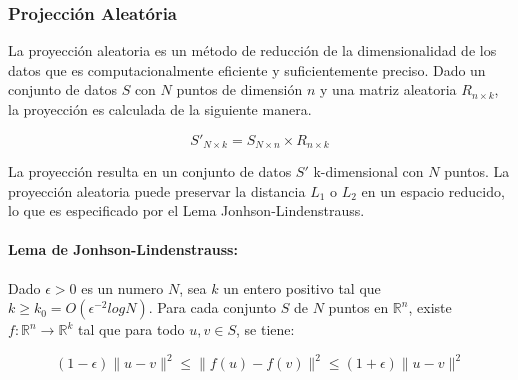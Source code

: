 \subsubsection{Projección Aleatória}

La proyección aleatoria es un método de reducción de la dimensionalidad de los datos que es computacionalmente eficiente y suficientemente preciso. Dado un conjunto de datos $S$ con $N$ puntos de dimensión $n$ y una matriz aleatoria  $ R_{n \times k} $, la proyección es calculada de la siguiente manera.

\begin{equation}
S'_{N \times k} = S_{N \times n} \times R _{n \times k}
\end{equation}

La proyección resulta en un conjunto de datos  $S'$ k-dimensional con $N$ puntos. La proyección aleatoria puede preservar la distancia $L_1$ o $L_2$ en un espacio reducido, lo que es especificado por el Lema Jonhson-Lindenstrauss.


\paragraph*{Lema de Jonhson-Lindenstrauss:} Dado $\epsilon > 0$ es un numero  $N$, sea $k$ un  entero positivo tal que $k \geq k_0 = O (\epsilon^{-2}log N)$. Para cada conjunto $S$ de $N$ puntos en  $\mathbb{R}^n$, existe $f: \mathbb{R}^n \rightarrow  \mathbb{R}^k$   tal que para todo $u,v \in S$, se tiene:

\begin{equation}\label{eq:JL-lemma}
  (1 - \epsilon) \parallel u - v \parallel^2 \leq \parallel f(u) - f(v) \parallel^2 \leq (1 + \epsilon)\parallel u - v \parallel^2
\end{equation}


